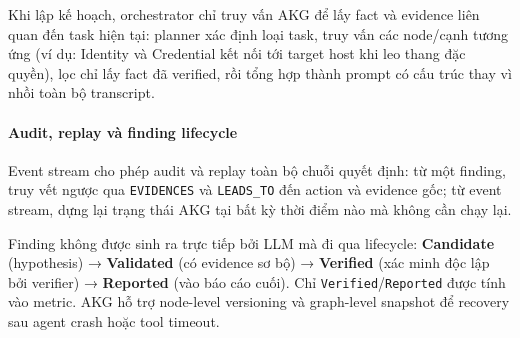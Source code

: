 Khi lập kế hoạch, orchestrator chỉ truy vấn AKG để lấy fact và evidence liên quan đến task hiện tại: planner xác định loại task, truy vấn các node/cạnh tương ứng (ví dụ: Identity và Credential kết nối tới target host khi leo thang đặc quyền), lọc chỉ lấy fact đã verified, rồi tổng hợp thành prompt có cấu trúc thay vì nhồi toàn bộ transcript.

\paragraph{Audit, replay và finding lifecycle}

Event stream cho phép audit và replay toàn bộ chuỗi quyết định: từ một finding, truy vết ngược qua \texttt{EVIDENCES} và \texttt{LEADS\_TO} đến action và evidence gốc; từ event stream, dựng lại trạng thái AKG tại bất kỳ thời điểm nào mà không cần chạy lại.

Finding không được sinh ra trực tiếp bởi LLM mà đi qua lifecycle: \textbf{Candidate} (hypothesis) → \textbf{Validated} (có evidence sơ bộ) → \textbf{Verified} (xác minh độc lập bởi verifier) → \textbf{Reported} (vào báo cáo cuối). Chỉ \texttt{Verified}/\texttt{Reported} được tính vào metric. AKG hỗ trợ node-level versioning và graph-level snapshot để recovery sau agent crash hoặc tool timeout.

